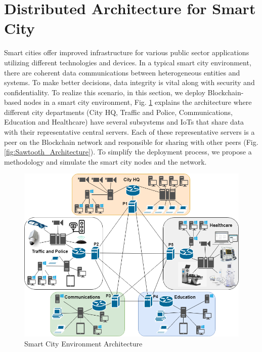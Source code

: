 \section{Distributed Architecture for Smart City}
\label{sec:Architecture}
Smart cities offer improved infrastructure for various public sector applications utilizing different technologies and devices. In a typical smart city environment, there are coherent data communications between heterogeneous entities and systems. To make better decisions, data integrity is vital along with security and confidentiality. To realize this scenario, in this section, we deploy Blockchain-based nodes in a smart city environment, Fig. \ref{fig:Main_Architecture} explains the architecture where different city departments (City HQ, Traffic and Police, Communications, Education and Healthcare) have several subsystems and IoTs that share data with their representative central servers. Each of these representative servers is a peer on the Blockchain network and responsible for sharing with other peers (Fig. \ref{fig:Sawtooth_Architecture}). To simplify the deployment process, we propose a methodology and simulate the smart city nodes and the network.

\begin{figure}[!ht] %
    \centering
    \setlength{\belowcaptionskip}{-10pt}
    \includegraphics[scale=.30]{figs/main_arch.png}
    \caption{Smart City Environment Architecture}
    \label{fig:Main_Architecture} %
\end{figure}

